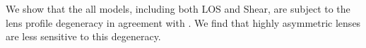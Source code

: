 We show that the all models, including both LOS and Shear, are subject to the lens profile degeneracy in agreement with \citet{Xu15, Schneider13}. We find that highly asymmetric lenses are less sensitive to this degeneracy.